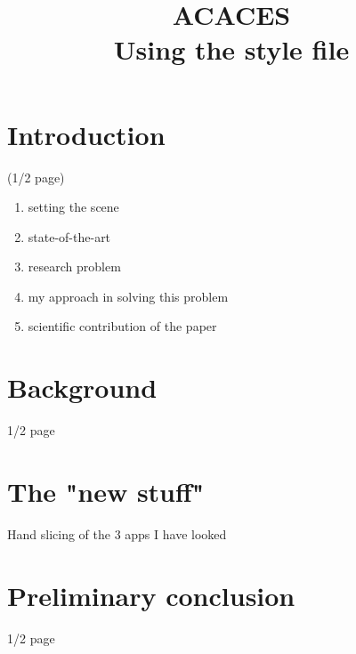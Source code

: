 \documentclass{acaces}
\begin{document}
\title{ACACES\\
Using the style file
}

\pagestyle{empty}

\begin{abstract}

\end{abstract}


\section{Introduction}

(1/2 page)

\begin{enumerate}
\item setting the scene
\item state-of-the-art
\item research problem
\item my approach in solving this problem
\item scientific contribution of the paper
\end{enumerate}


\section{Background}

1/2 page


\section{The "new stuff"} 

Hand slicing of the 3 apps I have looked

\section{Preliminary conclusion}

1/2 page


\end{document}
